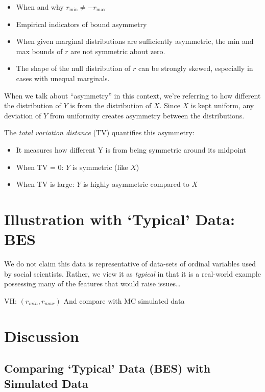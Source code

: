 \documentclass[
  12pt,
]{article}
\providecommand{\tightlist}{%
  \setlength{\itemsep}{0pt}\setlength{\parskip}{0pt}}
\theoremstyle{plain}
\theoremstyle{definition}
\theoremstyle{remark}
\begin{document}
\begin{itemize}
\item
  When and why \(r_{\min} \neq -r_{\max}\)
\item
  Empirical indicators of bound asymmetry
\item
  When given marginal distributions are sufficiently asymmetric, the min
  and max bounds of \(r\) are not symmetric about zero.
\item
  The shape of the null distribution of \(r\) can be strongly skewed,
  especially in cases with unequal marginals.
\end{itemize}

When we talk about ``asymmetry'' in this context, we're referring to how
different the distribution of \(Y\) is from the distribution of \(X\).
Since \(X\) is kept uniform, any deviation of \(Y\) from uniformity
creates asymmetry between the distributions.

The \emph{total variation distance} (TV) quantifies this asymmetry:

\begin{itemize}
\tightlist
\item
  It measures how different Y is from being symmetric around its
  midpoint
\item
  When TV = 0: \(Y\) is symmetric (like \(X\))
\item
  When TV is large: \(Y\) is highly asymmetric compared to \(X\)
\end{itemize}

\section{Illustration with `Typical' Data:
BES}\label{illustration-with-typical-data-bes}

We do not claim this data is representative of data-sets of ordinal
variables used by social scientists. Rather, we view it as
\emph{typical} in that it is a real-world example possessing many of the
features that would raise issues\ldots{}

VH: \((r_{min}, r_{max})\) And compare with MC simulated data

\section{Discussion}\label{discussion}

\subsection{Comparing `Typical' Data (BES) with Simulated
Data}\label{comparing-typical-data-bes-with-simulated-data}
\end{document}
